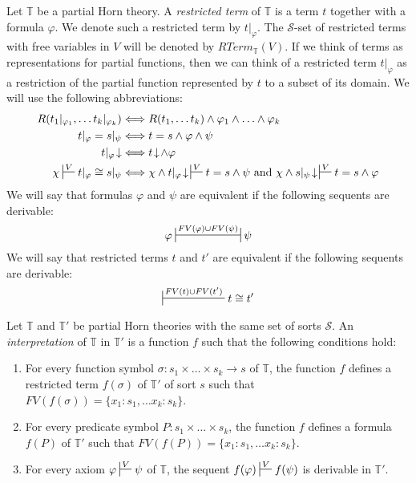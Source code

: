 \documentclass[reqno]{amsart}
\theoremstyle{definition}
\theoremstyle{remark}
\numberwithin{figure}{section}
\begin{document}
Let $\mathbb{T}$ be a partial Horn theory.
A \emph{restricted term} of $\mathbb{T}$ is a term $t$ together with a formula $\varphi$.
We denote such a restricted term by $t|_\varphi$.
The $\mathcal{S}$-set of restricted terms with free variables in $V$ will be denoted by $RTerm_\mathbb{T}(V)$.
If we think of terms as representations for partial functions,
then we can think of a restricted term $t|_\varphi$ as a restriction of the partial function represented by $t$ to a subset of its domain.
We will use the following abbreviations:
\begin{align*}
R(t_1|_{\varphi_1}, \ldots t_k|_{\varphi_k}) & \Longleftrightarrow R(t_1, \ldots t_k) \land \varphi_1 \land \ldots \land \varphi_k \\
t|_\varphi = s|_\psi & \Longleftrightarrow t = s \land \varphi \land \psi \\
t|_\varphi\!\downarrow & \Longleftrightarrow t\!\downarrow\!\land \varphi \\
\chi \sststile{}{V} t|_\varphi \cong s|_\psi & \Longleftrightarrow \chi \land t|_\varphi\!\downarrow\,\sststile{}{V} t = s \land \psi \text{ and } \chi \land s|_\psi\!\downarrow\,\sststile{}{V} t = s \land \varphi
\end{align*}
We will say that formulas $\varphi$ and $\psi$ are equivalent if the following sequents are derivable:
\[ \varphi \ssststile{}{FV(\varphi) \cup FV(\psi)} \psi \]
We will say that restricted terms $t$ and $t'$ are equivalent if the following sequents are derivable:
\[ \sststile{}{FV(t) \cup FV(t')} t \cong t' \]

Let $\mathbb{T}$ and $\mathbb{T}'$ be partial Horn theories with the same set of sorts $\mathcal{S}$.
An \emph{interpretation} of $\mathbb{T}$ in $\mathbb{T}'$ is a function $f$ such that the following conditions hold:
\begin{enumerate}
\item For every function symbol $\sigma : s_1 \times \ldots \times s_k \to s$ of $\mathbb{T}$,
the function $f$ defines a restricted term $f(\sigma)$ of $\mathbb{T}'$ of sort $s$ such that $FV(f(\sigma)) = \{ x_1 : s_1, \ldots x_k : s_k \}$.
\item For every predicate symbol $P : s_1 \times \ldots \times s_k$,
the function $f$ defines a formula $f(P)$ of $\mathbb{T}'$ such that $FV(f(P)) = \{ x_1 : s_1, \ldots x_k : s_k \}$.
\item For every axiom $\varphi \sststile{}{V} \psi$ of $\mathbb{T}$, the sequent $f(\varphi) \sststile{}{V} f(\psi)$ is derivable in $\mathbb{T}'$.
\end{enumerate}
\end{document}
